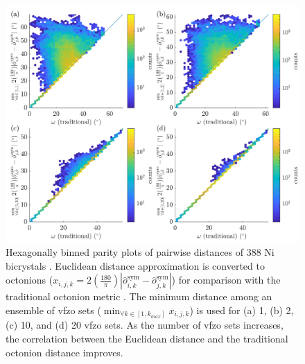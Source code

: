 \documentclass[final,twocolumn,12pt]{elsarticle}
\begin{document}
\begin{figure}
    \centering
    \includegraphics[scale=1]{figures/dist-ensemble-k1-2-10-20.png}
    \caption{Hexagonally binned parity plots of pairwise distances of 388 Ni bicrystals \cite{olmstedSurveyComputedGrain2009a}. Euclidean distance approximation is converted to octonions ($x_{i,j,k}=2\left(\frac{180}{\pi}\right)|\hat{o}_{i,k}^{\text{sym}}-\hat{o}_{j,k}^{\text{sym}}|$) for comparison with the traditional octonion metric \cite{chesserLearningGrainBoundary2020}. The minimum distance among an ensemble of \gls{vfzo} sets ($\min_{\forall k \in [1,k_{max}]}x_{i,j,k}$) is used for (a) 1, (b) 2, (c) 10, and (d) 20 \gls{vfzo} sets. As the number of \gls{vfzo} sets increases, the correlation between the Euclidean distance and the traditional octonion distance improves.}
    \label{fig:dist-ensemble-k1-2-10-20}
\end{figure}
\end{document}
